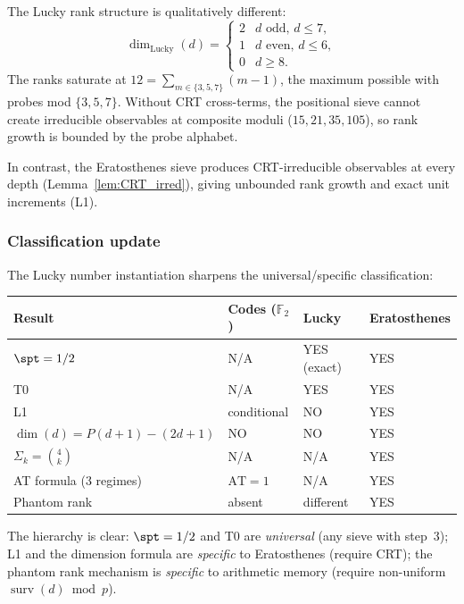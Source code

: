 \documentclass[12pt,a4paper]{article}
\begin{document}
The Lucky rank structure is qualitatively different:
\[
  \dim_{\mathrm{Lucky}}(d) = \begin{cases}
    2 & d \text{ odd, } d \le 7, \\
    1 & d \text{ even, } d \le 6, \\
    0 & d \ge 8.
  \end{cases}
\]
The ranks saturate at $12 = \sum_{m \in \{3,5,7\}} (m - 1)$, the maximum
possible with probes mod $\{3, 5, 7\}$.  Without CRT cross-terms, the
positional sieve cannot create irreducible observables at composite moduli
($15, 21, 35, 105$), so rank growth is bounded by the probe alphabet.

In contrast, the Eratosthenes sieve produces CRT-irreducible observables
at every depth (Lemma~\ref{lem:CRT_irred}), giving unbounded rank growth
and exact unit increments (L1).

\subsubsection{Classification update}

The Lucky number instantiation sharpens the universal/specific classification:

\begin{center}
\begin{tabular}{llll}
\toprule
\textbf{Result} & \textbf{Codes ($\mathbb{F}_2$)} & \textbf{Lucky} & \textbf{Eratosthenes} \\
\midrule
$\spt = 1/2$ & N/A & YES (exact) & YES \\
T0 & N/A & YES & YES \\
L1 & conditional & NO & YES \\
$\dim(d) = P(d{+}1) - (2d{+}1)$ & NO & NO & YES \\
$\Sigma_k = \binom{4}{k}$ & N/A & N/A & YES \\
AT formula (3 regimes) & $\mathrm{AT} = 1$ & N/A & YES \\
Phantom rank & absent & different & YES \\
\bottomrule
\end{tabular}
\end{center}

\noindent
The hierarchy is clear: $\spt = 1/2$ and T0 are \emph{universal} (any sieve
with step~3); L1 and the dimension formula are \emph{specific} to
Eratosthenes (require CRT); the phantom rank mechanism is \emph{specific}
to arithmetic memory (require non-uniform $\operatorname{surv}(d) \bmod p$).
\end{document}
